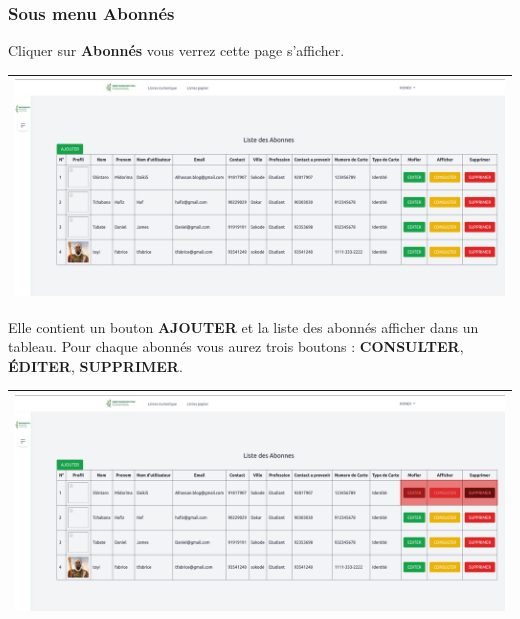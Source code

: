 \documentclass[12pt,a4paper]{article}
\begin{document}
\subsubsection{Sous menu \textbf{Abonnés}}
Cliquer sur \textbf{Abonnés} vous verrez cette page s'afficher.\\
\begin{center}
\begin{tabular}{|p{17cm}|}
\hline 
\includegraphics[width=\textwidth]{img/abonnes.png} \\ 
\hline 
\end{tabular} 
\end{center}
Elle contient un bouton \textbf{AJOUTER} et la liste des abonnés afficher dans un tableau.
Pour chaque abonnés vous aurez trois boutons : \textbf{CONSULTER}, \textbf{ÉDITER}, 
\textbf{SUPPRIMER}.\\
\begin{center}
\begin{tabular}{|p{17cm}|}
\hline 
\includegraphics[width=\textwidth]{img/abonnes_btns.png} \\ 
\hline 
\end{tabular} 
\end{center}
\end{document}
